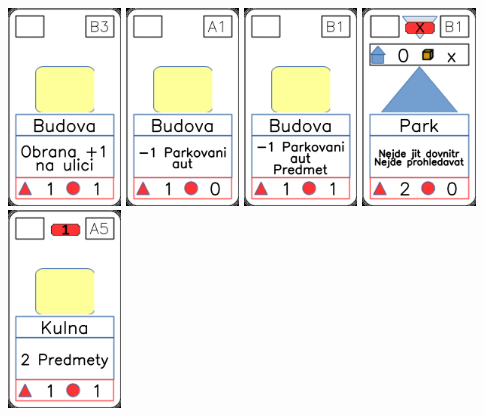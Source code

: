 \documentclass[a4paper]{article}
\begin{document}
	\includegraphics[width=3.0cm]{img-2_7}
	\includegraphics[width=3.0cm]{img-2_0}
	\includegraphics[width=3.0cm]{img-2_5}
	\includegraphics[width=3.0cm]{img-3_20}
	\includegraphics[width=3.0cm]{img-2_19}
\end{document}
